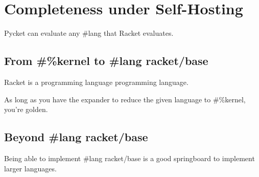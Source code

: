 	\section[\texorpdfstring{Completeness under Self-Hosting}{Completeness}]{Completeness under Self-Hosting}

		\begin{mainpoint}
			Pycket can evaluate any \#lang that Racket evaluates.
		\end{mainpoint}

		\subsection{From \#\%kernel to \#lang racket/base}
			\begin{mainpoint}
				Racket is a programming language programming language.

				As long as you have the expander to reduce the given language to \#\%kernel, you're golden.
			\end{mainpoint}

		\subsection{Beyond \#lang racket/base}
			\begin{mainpoint}
				Being able to implement \#lang racket/base is a good springboard to implement larger languages.
			\end{mainpoint}